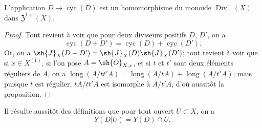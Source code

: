 \begin{proposition}[21.6.6]
\label{IV.21.6.6}
L'application $D\mapsto\operatorname{cyc}(D)$ est un homomorphisme du monoïde $\operatorname{Div}^+(X)$ dans $\mathfrak{Z}^{1+}(X)$.
\end{proposition}

\begin{proof}
Tout revient à voir que pour deux diviseurs positifs $D$, $D'$, on a
\[
  \operatorname{cyc}(D+D')=\operatorname{cyc}(D)+\operatorname{cyc}(D').
\]
Or, on a  $\sh{J}_X(D+D')=\sh{J}_X(D)\sh{J}_X(D')$;
tout revient à voir que si $x\in X^{(1)}$, si l'on pose $A=\sh{O}_{X,x}$, et si $t$ et $t'$ sont deux éléments réguliers de $A$, on a $\operatorname{long}(A/tt'A)=\operatorname{long}(A/tA)+\operatorname{long}(A/t'A)$;
mais puisque $t$ est régulier, $tA/tt'A$ est isomorphe à $A/t'A$, d'où aussitôt la proposition.
\end{proof}

Il résulte aussitôt des définitions que pour tout ouvert $U\subset X$, on a
\[
  Y(D|U)=Y(D)\cap U,
\]
